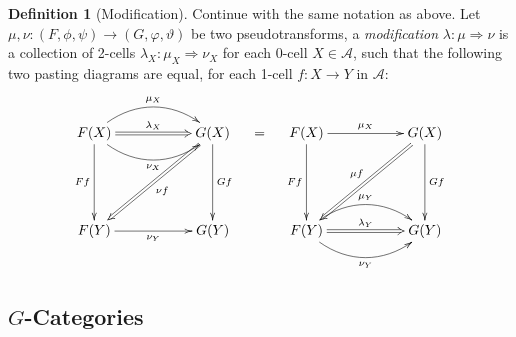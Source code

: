\documentclass[openany, amssymb, psamsfonts]{amsart}
\theoremstyle{definition}
\newtheorem{defn}{Definition}[section]
\numberwithin{equation}{section}
\newcommand{\Cat}{\mathbf{Cat}} %
\newcommand{\A}{\mathscr{A}}
\begin{document}
\vspace{1pt}

\begin{defn}[Modification]\label{defn_modification}
    Continue with the same notation as above. Let $\mu,\nu:(F,\phi,\psi)\rightarrow (G,\varphi,\vartheta)$ be two pseudotransforms, a \emph{modification} $\lambda:\mu\Rightarrow\nu$ is a collection of 2-cells $\lambda_X:\mu_X\Rightarrow\nu_X$ for each 0-cell $X\in\A$, such that the following two pasting diagrams are equal, for each 1-cell $f:X\rightarrow Y$ in $\A$:
    \begin{align*}
        \xymatrix{
            F(X) \ar[dd]_-{Ff} \ar@(ur,ul)[rr]^-{\mu_X} \ar@(dr,dl)[rr]_-{\nu_X} \ar@{=>}[rr]^-{\lambda_X} && G(X) \ar@{=>}[ddll]^-{\nu f} \ar[dd]^-{Gf}\\
            \\
            F(Y) \ar[rr]_-{\nu_Y} && G(Y)
        }\quad = \quad \xymatrix{
            F(X) \ar[dd]_-{Ff} \ar[rr]^-{\mu_X} && G(X) \ar[dd]^-{Gf} \ar@{=>}[ddll]_-{\mu f}\\
            \\
            F(Y) \ar@(ur,ul)[rr]^-{\mu_Y} \ar@{=>}[rr]^-{\lambda_Y} \ar@(dr,dl)[rr]_-{\nu_Y} && G(Y)
        }
    \end{align*}

\end{defn}

\vspace{1pt}




\subsection{$G$-Categories}\label{sub_G_cat}
\end{document}
